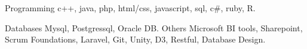 

\begin{cvskills}

  \cvskill
   	 {Programming} %
   	 { c++, java, php, html/css, javascript, sql, c\#, ruby, R.} %

 \cvskill
	{Databases}
	{Mysql, Postgressql,  Oracle DB.}
 \cvskill
	{Others}
	{Microsoft BI tools, Sharepoint, Scrum Foundations, Laravel, Git, Unity, D3, Restful, Database Design.}


\end{cvskills}
